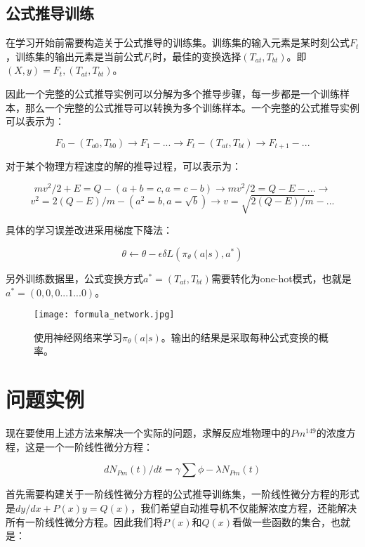 \documentclass[runningheads]{llncs}
\begin{document}
\subsection{公式推导训练}
在学习开始前需要构造关于公式推导的训练集。训练集的输入元素是某时刻公式$F_t$，训练集的输出元素是当前公式$F_t$时，最佳的变换选择$(T_{at},T_{bt})$。即$(X,y)={F_t,(T_{at},T_{bt})}$。

因此一个完整的公式推导实例可以分解为多个推导步骤，每一步都是一个训练样本，那么一个完整的公式推导可以转换为多个训练样本。一个完整的公式推导实例可以表示为：

$$F_0 -(T_{a0},T_{b0})\to F_1 -...\to F_t -(T_{at},T_{bt})\to F_{t+1} -...$$

对于某个物理方程速度的解的推导过程，可以表示为：

$$mv^2/2+E=Q -(a+b=c,a=c-b)\to mv^2/2=Q-E -...\to $$
$$v^2=2(Q-E)/m -(a^2=b,a=\sqrt b)\to v=\sqrt{ 2(Q-E)/m}-...$$

具体的学习误差改进采用梯度下降法：

$$\theta \leftarrow \theta - \epsilon \delta L(\pi_{\theta}(a|s),a^*)$$

另外训练数据里，公式变换方式$a^*=(T_{at},T_{bt})$需要转化为one-hot模式，也就是$a^*=(0,0,0...1...0)$。

\begin{figure}[H]
\centering
\texttt{[image: formula\_network.jpg]}
\caption{使用神经网络来学习$\pi_{\theta}(a|s)$。输出的结果是采取每种公式变换的概率。}
\end{figure}












\section{问题实例}
现在要使用上述方法来解决一个实际的问题，求解反应堆物理中的$Pm^{149}$的浓度方程，这是一个一阶线性微分方程：

$$dN_{Pm}(t)/dt = \gamma \sum \phi - \lambda N_{Pm}(t) $$

首先需要构建关于一阶线性微分方程的公式推导训练集，一阶线性微分方程的形式是$dy/dx + P(x)y = Q(x) $，我们希望自动推导机不仅能解浓度方程，还能解决所有一阶线性微分方程。因此我们将$P(x) $和$Q(x) $看做一些函数的集合，也就是：
\end{document}

